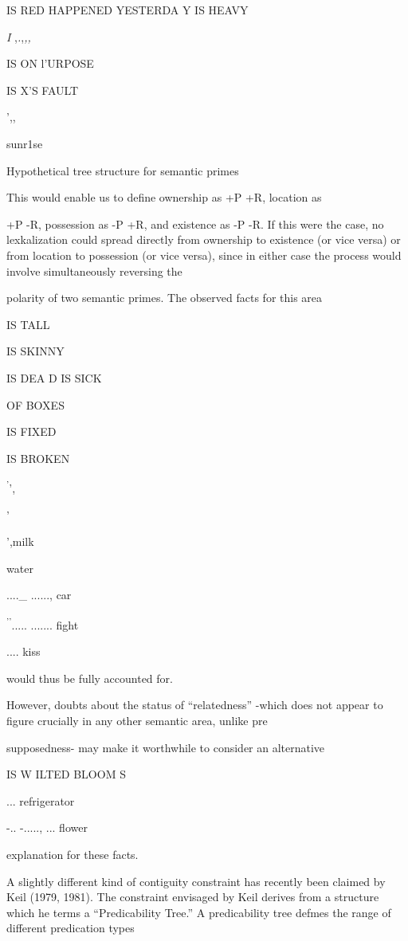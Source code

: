 IS RED HAPPENED YESTERDA Y IS HEAVY

\textit{I },\textit{.},\textit{,,}

IS ON l'URPOSE

IS X'S FAULT

',,

sunr1se

Hypothetical tree structure for semantic primes

This would enable us to define ownership as +P +R, location as

+P {}-R, possession as {}-P +R, and existence as {}-P {}-R. If this were the case, no lexkalization could spread directly from ownership to exis\-tence (or vice versa) or from location to possession (or vice versa), since in either case the process would involve simultaneously reversing the

polarity of two semantic primes. The observed facts for this area

IS TALL

IS SKINNY 

IS DEA D IS SICK

OF BOXES

IS FIXED

IS BROKEN

\textsuperscript{'}',

'

',milk

water

....\_ ......, car

\textsuperscript{'}\textsuperscript{'}..... ....... fight

.... kiss

would thus be fully accounted for. 

However, doubts about the status of ``relatedness'' {}-which does not appear to figure crucially in any other semantic area, unlike pre\-

supposedness- may make it worthwhile to consider an alternative

IS W ILTED BLOOM S 

... refrigerator

{}-.. {}-....., ... flower

explanation for these facts.

A slightly different kind of contiguity constraint has recently been claimed by Keil (1979, 1981). The constraint envisaged by Keil derives from a structure which he terms a ``Predicability Tree.'' A predicability tree defmes the range of different predication types

